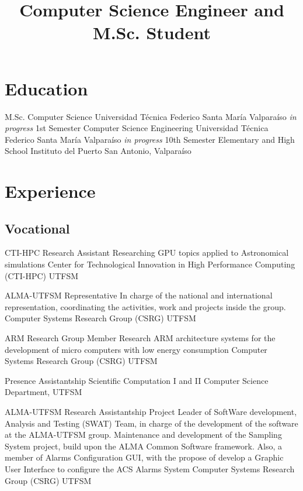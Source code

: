 \documentclass[11pt,a4paper]{moderncv}
\title{\large Computer Science Engineer and M.Sc. Student}               %
\begin{document}
\maketitle

\section{Education}
	{M.Sc. Computer Science}
	{Universidad Técnica Federico Santa María}
	{Valparaíso}
	{\emph{in progress}}
	{1st Semester}
	{Computer Science Engineering}
	{Universidad Técnica Federico Santa María}
	{Valparaíso}
	{\emph{in progress}}
	{10th Semester}
	{Elementary and High School}
	{Instituto del Puerto}
	{San Antonio, Valparaíso}
	{}{}

\vspace{-0.5cm}
\section{Experience}
\subsection{Vocational}

    {CTI-HPC Research Assistant}
    {Researching GPU topics applied to Astronomical simulations}
    {Center for Technological Innovation in High Performance Computing (CTI-HPC)}
    {UTFSM}
    {}

	{ALMA-UTFSM Representative}
	{In charge of the national and international representation, coordinating the activities, work and projects inside the group.}
	{Computer Systems Research Group (CSRG)}
	{UTFSM}
	{}

	{ARM Research Group Member}
	{Research ARM architecture systems for the development of micro computers with low energy consumption}
	{Computer Systems Research Group (CSRG)}
	{UTFSM}
	{}

	{Presence Assistantship}
	{Scientific Computation I and II}
	{Computer Science Department, UTFSM}
	{}{}

	{ALMA-UTFSM Research Assistantship}
	{Project Leader of SoftWare development, Analysis and Testing (SWAT) Team, in charge of the development of the software at the ALMA-UTFSM group. 
	Maintenance and development of the Sampling System project, build upon the ALMA Common Software framework.
	Also, a member of Alarms Configuration GUI, with the propose of develop a Graphic User Interface to configure the ACS Alarms System}
	{Computer Systems Research Group (CSRG)}
	{UTFSM}
	{}
\end{document}
